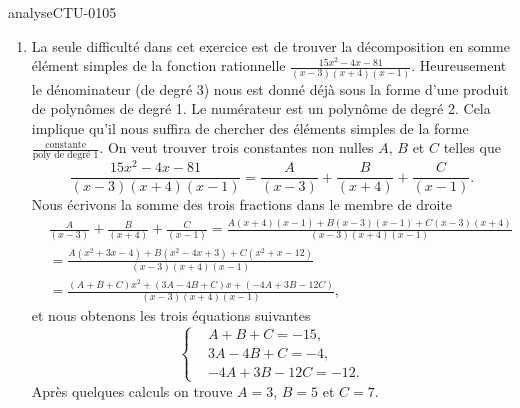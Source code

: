 \begin{corrige}{analyseCTU-0105}

    \begin{enumerate}
  \item La seule difficult\'e dans cet exercice est de trouver la d\'ecomposition en somme \'el\'ement simples de la fonction rationnelle $\displaystyle \frac{15x^2-4x-81}{(x-3)(x+4)(x-1)}$. Heureusement le d\'enominateur (de degr\'e 3) nous est donn\'e d\'ej\`a sous la forme d'une produit de polyn\^omes de degr\'e 1. Le num\'erateur est un polyn\^ome de degr\'e 2. Cela implique qu'il nous suffira de chercher des \'el\'ements simples de la forme $\frac{\text{constante}}{\text{poly de degr\'e 1}}$. On veut trouver trois constantes non nulles $A, \, B$ et $C$ telles que 
    \begin{equation*}
      \frac{15x^2-4x-81}{(x-3)(x+4)(x-1)} = \frac{A}{(x-3)} + \frac{B}{(x+4)} + \frac{C}{(x-1)} .
    \end{equation*}
Nous \'ecrivons la somme des trois fractions dans le membre de droite
\begin{equation*}
  \begin{aligned}
    &\frac{A}{(x-3)} + \frac{B}{(x+4)} + \frac{C}{(x-1)}= \frac{A(x+4)(x-1) + B(x-3)(x-1)+ C(x-3)(x+4) }{(x-3)(x+4)(x-1)}\\
    &= \frac{A(x^2+3x-4) + B(x^2-4x+3)+ C(x^2 +x-12) }{(x-3)(x+4)(x-1)} \\ 
    &= \frac{(A+B+C)x^2+ (3A-4B+C)x + (-4A +3B-12C)}{(x-3)(x+4)(x-1)},
  \end{aligned}
\end{equation*}
et nous obtenons les trois \'equations suivantes 
\begin{equation*}
  \begin{cases}
    &   A+B+C = -15, \\
    &   3A-4B+C = -4, \\
    &   -4A +3B-12C = -12.
  \end{cases}
\end{equation*}
Apr\`es quelques calculs on trouve $A=3$, $B=5$ et $C=7$. 


\end{enumerate}
\end{corrige}
